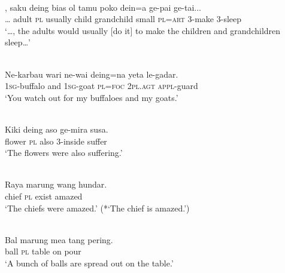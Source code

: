 \ea%
\label{ex:9:3}
 \\
\gll  {\dots}, saku deing bias ol tamu poko dein=a ge-pai ge-tai...\\
  {\dots} adult \textsc{pl} usually child grandchild small \textsc{pl=art} \textsc{3-}make 3-sleep\\
\glt `{\dots}, the adults would usually [do it] to make the children and grandchildren sleep{\dots}'
\z








\ea%
\label{ex:9:4}
 \\
\gll Ne-karbau wari ne-wai deing=na yeta le-gadar.{\upshapefootnotemark}\\
  \textsc{1sg}\textsc{-}buffalo and \textsc{1sg-}goat \textsc{pl}=\textsc{foc} \textsc{2pl.agt} \textsc{appl-}guard\\
\glt `You watch out for my buffaloes and my goats.' 
\z







\ea%
\label{ex:9:5}
 \\
\gll Kiki deing aso ge-mira susa. \\
  flower \textsc{pl} also 3-inside suffer  \\
\glt `The flowers were also suffering.'
 \z








\ea%
\label{ex:9:6}
 \\
\gll  Raya marung wang hundar. \\
   chief \textsc{pl} exist amazed  \\
\glt `The chiefs were amazed.' (*`The chief is amazed.')
\z







\ea%
\label{ex:9:7}
 \\
\gll Bal  marung mea tang pering.  \\
  ball \textsc{pl} table on pour   \\
\glt `A bunch of balls are spread out on the table.'
\z


